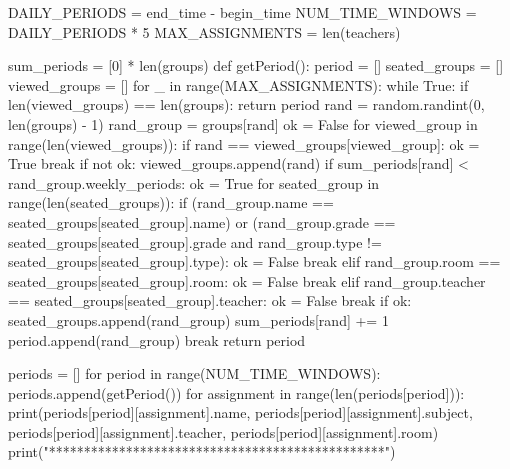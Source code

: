 \documentclass[a4paper,12pt]{article}
\begin{document}
\begin{python}
DAILY_PERIODS = end_time - begin_time
NUM_TIME_WINDOWS = DAILY_PERIODS * 5
MAX_ASSIGNMENTS = len(teachers)


sum_periods = [0] * len(groups)
def getPeriod():
    period = []
    seated_groups = []
    viewed_groups = []
    for _ in range(MAX_ASSIGNMENTS):
        while True:
            if len(viewed_groups) == len(groups):
                return period
            rand = random.randint(0, len(groups) - 1)
            rand_group = groups[rand]
            ok = False
            for viewed_group in range(len(viewed_groups)):
                if rand == viewed_groups[viewed_group]:
                    ok = True
                    break
            if not ok:
                viewed_groups.append(rand)
                if sum_periods[rand] < rand_group.weekly_periods:
                    ok = True
                    for seated_group in range(len(seated_groups)):
                        if (rand_group.name == seated_groups[seated_group].name) or (rand_group.grade == seated_groups[seated_group].grade and rand_group.type != seated_groups[seated_group].type):
                            ok = False
                            break
                        elif rand_group.room == seated_groups[seated_group].room:
                            ok = False
                            break
                        elif rand_group.teacher == seated_groups[seated_group].teacher:
                            ok = False
                            break
                    if ok:
                        seated_groups.append(rand_group)
                        sum_periods[rand] += 1
                        period.append(rand_group)
                        break
    return period


periods = []
for period in range(NUM_TIME_WINDOWS):
    periods.append(getPeriod())
    for assignment in range(len(periods[period])):
        print(periods[period][assignment].name, periods[period][assignment].subject, periods[period][assignment].teacher, periods[period][assignment].room)
    print("************************************************")
\end{python}
\end{document}
